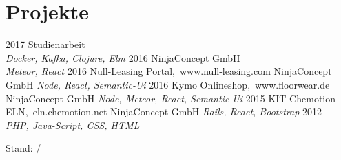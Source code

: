 \documentclass[]{friggeri-cv}
\newcommand{\monthandyear}{\the\month/\the\year}
\begin{document}
\section{Projekte}

\begin{entrylist}
  \entry
    {2017}
    {}
    {Studienarbeit}
    {\\\emph{Docker, Kafka, Clojure, Elm}}
  \entry
    {2016}
    {}
    {NinjaConcept GmbH}
    {\\\emph{Meteor, React}}
  \entry
    {2016}
    {Null-Leasing Portal{\normalfont ,~www.null-leasing.com}}
    {NinjaConcept GmbH}
    {\emph{Node, React, Semantic-Ui}}
  \entry
    {2016}
    {Kymo Onlineshop{\normalfont ,~www.floorwear.de}}
    {NinjaConcept GmbH}
    {\emph{Node, Meteor, React, Semantic-Ui}}
  \entry
    {2015}
    {KIT Chemotion ELN{\normalfont ,~eln.chemotion.net}}
    {NinjaConcept GmbH}
    {\emph{Rails, React, Bootstrap}}
  \entry
    {2012}
    {}
    {}
    {\\\emph{PHP, Java-Script, CSS, HTML}}
\end{entrylist}

\vfill
\begin{flushright}
{\footnotesize{} Stand: \monthandyear{}}
\end{flushright}
%

% 
\end{document}
